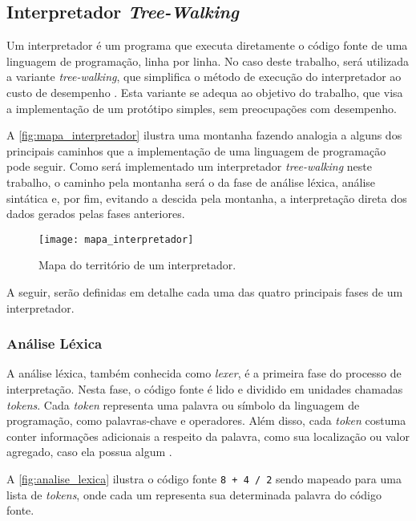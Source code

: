 \subsection{Interpretador \textit{Tree-Walking}}

Um interpretador é um programa que executa diretamente o código fonte de uma linguagem de programação, linha por linha. No caso deste trabalho, será utilizada a variante \textit{tree-walking}, que simplifica o método de execução do interpretador ao custo de desempenho \cite{craftinginterpreters}. Esta variante se adequa ao objetivo do trabalho, que visa a implementação de um protótipo simples, sem preocupações com desempenho.

A \autoref{fig:mapa_interpretador} ilustra uma montanha fazendo analogia a alguns dos principais caminhos que a implementação de uma linguagem de programação pode seguir. Como será implementado um interpretador \textit{tree-walking} neste trabalho, o caminho pela montanha será o da fase de análise léxica, análise sintática e, por fim, evitando a descida pela montanha, a interpretação direta dos dados gerados pelas fases anteriores.

\begin{figure}[H]
	\centering
	\texttt{[image: mapa\_interpretador]}
	\caption{Mapa do território de um interpretador.}
	\label{fig:mapa_interpretador}
\end{figure}

A seguir, serão definidas em detalhe cada uma das quatro principais fases de um interpretador.

\subsubsection{Análise Léxica}

A análise léxica, também conhecida como \textit{lexer}, é a primeira fase do processo de interpretação. Nesta fase, o código fonte é lido e dividido em unidades chamadas \textit{tokens}. Cada \textit{token} representa uma palavra ou símbolo da linguagem de programação, como palavras-chave e operadores. Além disso, cada \textit{token} costuma conter informações adicionais a respeito da palavra, como sua localização ou valor agregado, caso ela possua algum \cite{craftinginterpreters}.

A \autoref{fig:analise_lexica} ilustra o código fonte \texttt{8 + 4 / 2} sendo mapeado para uma lista de \textit{tokens}, onde cada um representa sua determinada palavra do código fonte.

